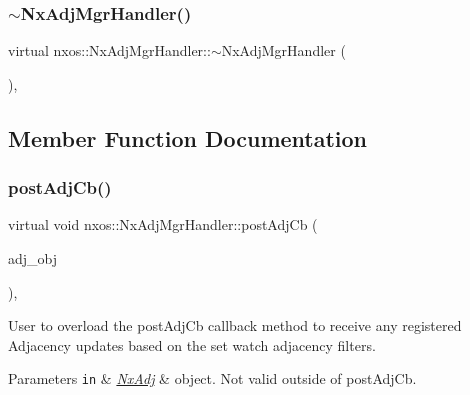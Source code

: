\subsubsection{\texorpdfstring{$\sim$\+Nx\+Adj\+Mgr\+Handler()}{~NxAdjMgrHandler()}}
{\footnotesize\ttfamily virtual nxos\+::\+Nx\+Adj\+Mgr\+Handler\+::$\sim$\+Nx\+Adj\+Mgr\+Handler (\begin{DoxyParamCaption}{ }\end{DoxyParamCaption})\hspace{0.3cm}{\ttfamily [inline]}, {\ttfamily [virtual]}}



\subsection{Member Function Documentation}
\mbox{\label{classnxos_1_1_nx_adj_mgr_handler_a9a1f85f218eab71d9c280088f69a14dc}} 
\subsubsection{\texorpdfstring{post\+Adj\+Cb()}{postAdjCb()}}
{\footnotesize\ttfamily virtual void nxos\+::\+Nx\+Adj\+Mgr\+Handler\+::post\+Adj\+Cb (\begin{DoxyParamCaption}\item[{\mbox{\hyperlink{classnxos_1_1_nx_adj}{Nx\+Adj}} $\ast$}]{adj\+\_\+obj }\end{DoxyParamCaption})\hspace{0.3cm}{\ttfamily [inline]}, {\ttfamily [virtual]}}

User to overload the post\+Adj\+Cb callback method to receive any registered Adjacency updates based on the set watch adjacency filters.


\begin{DoxyParams}[1]{Parameters}
\mbox{\tt in}  & {\em \mbox{\hyperlink{classnxos_1_1_nx_adj}{Nx\+Adj}}} & object. Not valid outside of post\+Adj\+Cb.\\
\hline
\end{DoxyParams}

